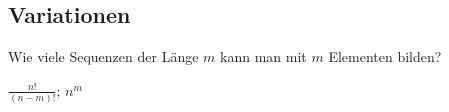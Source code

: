 \subsection{Variationen}
{\scriptsize Wie viele Sequenzen der Länge $m$ kann man mit $m$ Elementen bilden?}

 $\frac{n!}{(n - m)!}$;  $n^m$
